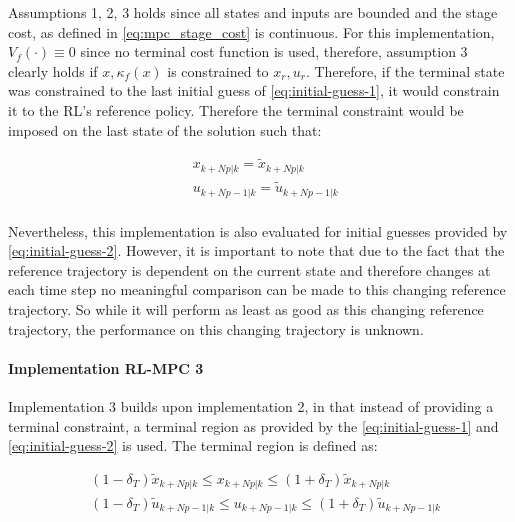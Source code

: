 Assumptions 1, 2, 3 holds since all states and inputs are bounded and the stage cost, as defined in \autoref{eq:mpc_stage_cost} is continuous. For this implementation, $V_f(\cdot) \equiv 0$ since no terminal cost function is used, therefore, assumption 3 clearly holds if $x,\kappa_f(x)$ is constrained to $x_r,u_r$. Therefore, if the terminal state was constrained to the last initial guess of \autoref{eq:initial-guess-1}, it would constrain it to the RL's reference policy. Therefore the terminal constraint would be imposed on the last state of the solution such that:

\begin{equation}\label{eq:terminal-constraint-ocp}
\begin{aligned}
	&x_{k+Np|k} = \tilde{x}_{k+Np|k}\\ 
	&u_{k+Np-1|k} = \tilde{u}_{k+Np-1|k}\\
\end{aligned}
\end{equation}

Nevertheless, this implementation is also evaluated for initial guesses provided by \autoref{eq:initial-guess-2}. However, it is important to note that due to the fact that the reference trajectory is dependent on the current state and therefore changes at each time step no meaningful comparison can be made to this changing reference trajectory. So while it will perform as least as good as this changing reference trajectory, the performance on this changing trajectory is unknown.

\paragraph{Implementation RL-MPC 3}
Implementation 3 builds upon implementation 2, in that instead of providing a terminal constraint, a terminal region as provided by the \autoref{eq:initial-guess-1} and \autoref{eq:initial-guess-2} is used. The terminal region is defined as:

\begin{equation}\label{eq:terminal-region}
	\begin{aligned}
		& (1-\delta_T)\tilde{x}_{k+Np|k} \leq x_{k+Np|k} \leq (1+\delta_T)\tilde{x}_{k+Np|k}\\
		&(1-\delta_T)\tilde{u}_{k+Np-1|k} \leq u_{k+Np-1|k} \leq (1+\delta_T) \tilde{u}_{k+Np-1|k}\\
	\end{aligned}
\end{equation}

